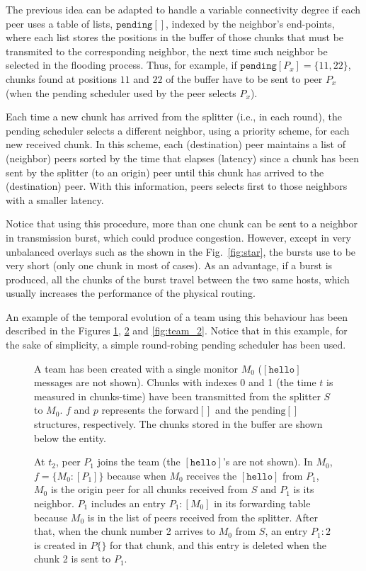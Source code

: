 The previous idea can be adapted to handle a variable connectivity
degree if each peer uses a table of lists, $\mathtt{pending}[]$,
indexed by the neighbor's end-points, where each list stores the
positions in the buffer of those chunks that must be transmited to the
corresponding neighbor, the next time such neighbor be selected in the
flooding process. Thus, for example, if
$\mathtt{pending}[P_x]=\{11,22\}$, chunks found at positions $11$ and
$22$ of the buffer have to be sent to peer $P_x$ (when the pending
scheduler used by the peer selects $P_x$).

Each time a new chunk has arrived from the splitter (i.e., in each
round), the pending scheduler selects a different neighbor, using a
priority scheme, for each new received chunk. In this scheme, each
(destination) peer maintains a list of (neighbor) peers sorted by the
time that elapses (latency) since a chunk has been sent by the
splitter (to an origin) peer until this chunk has arrived to the
(destination) peer. With this information, peers selects first to
those neighbors with a smaller latency.

Notice that using this procedure, more than one chunk can be sent to a
neighbor in transmission burst, which could produce
congestion. However, except in very unbalanced overlays such as the
shown in the Fig.~\ref{fig:star}, the bursts use to be very short
(only one chunk in most of cases). As an advantage, if a burst is
produced, all the chunks of the burst travel between the two same
hosts, which usually increases the performance of the physical
routing.

An example of the temporal evolution of a team using this behaviour
has been described in the Figures \ref{fig:team_0}, \ref{fig:team_1}
and \ref{fig:team_2}. Notice that in this example, for the sake of
simplicity, a simple round-robing pending scheduler has been used.

\begin{figure}
   \caption{A team has been created with a
    single monitor $M_0$ ($[\mathtt{hello}]$ messages are not
    shown). Chunks with indexes 0 and 1 (the time $t$ is measured in
    chunks-time) have been transmitted from the splitter $S$ to
    $M_0$. $f$ and $p$ represents the $\text{forward}[]$ and the
    $\text{pending}[]$ structures, respectively. The chunks stored in
    the buffer are shown below the entity.\label{fig:team_0}}
\end{figure}

\begin{figure}
   \caption{At $t_2$, peer $P_1$ joins
    the team (the $[\mathtt{hello}]$'s are not shown). In $M_0$,
    $f=\{M_0:[P_1]\}$ because when $M_0$ receives the
    $[\mathtt{hello}]$ from $P_1$, $M_0$ is the origin peer for all
    chunks received from $S$ and $P_1$ is its neighbor. $P_1$ includes
    an entry $P_1:[M_0]$ in its forwarding table because $M_0$ is in
    the list of peers received from the splitter. After that, when the
    chunk number 2 arrives to $M_0$ from $S$, an entry $P_1:2$ is
    created in $P\{\}$ for that chunk, and this entry is deleted when
    the chunk 2 is sent to $P_1$.\label{fig:team_1}}
\end{figure}

